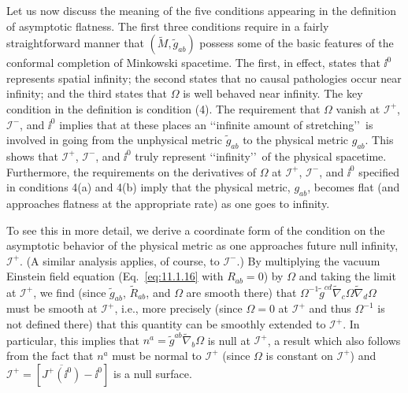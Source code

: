 Let us now discuss the meaning of the five conditions appearing in the definition of
asymptotic flatness. The first three conditions require in a fairly straightforward
manner that \((\tilde M,\tilde g_{ab})\) possess some of the basic features of the
conformal completion of Minkowski spacetime. The first, in effect, states that \(\ii^0\)
represents spatial infinity; the second states that no causal pathologies occur near
infinity; and the third states that \(\Omega\) is well behaved near infinity. The key
condition in the definition is condition (4). The requirement that \(\Omega\) vanish
at \(\mathcal I^+\), \(\mathcal I^-\), and \(\ii^0\) implies that at these places an
\lq\lq infinite amount of stretching\rq\rq\ is involved in going from the unphysical
metric \(\tilde g_{ab}\) to the physical metric \(g_{ab}\). This shows that
\(\mathcal I^+\), \(\mathcal I^-\), and \(\ii^0\) truly represent \lq\lq infinity\rq\rq\ of
the physical spacetime. Furthermore, the requirements on the derivatives of
\(\Omega\) at \(\mathcal I^+\), \(\mathcal I^-\), and \(\ii^0\) specified in conditions
4(a) and 4(b) imply that the physical metric, \(g_{ab}\), becomes flat (and
approaches flatness at the appropriate rate) as one goes to infinity.

To see this in more detail, we derive a coordinate form of the condition on the
asymptotic behavior of the physical metric as one approaches future null infinity,
\(\mathcal I^+\). (A similar analysis applies, of course, to \(\mathcal I^-\).) By
multiplying the vacuum Einstein field equation (Eq.~\eqref{eq:11.1.16} with
\(R_{ab}=0\)) by \(\Omega\) and taking the limit at \(\mathcal I^+\), we find (since
\(\tilde g_{ab}\), \(\tilde R_{ab}\), and \(\Omega\) are smooth there) that
\(\Omega^{-1}\tilde g^{cd}\tilde\nabla_c\Omega\tilde\nabla_d\Omega\) must be smooth
at \(\mathcal I^+\), i.e., more precisely (since \(\Omega=0\) at \(\mathcal I^+\) and
thus \(\Omega^{-1}\) is not defined there) that this quantity can be smoothly
extended to \(\mathcal I^+\). In particular, this implies that
\(n^a=\tilde g^{ab}\tilde\nabla_b\Omega\) is null at \(\mathcal I^+\), a result which
also follows from the fact that \(n^a\) must be normal to \(\mathcal I^+\) (since
\(\Omega\) is constant on \(\mathcal I^+\)) and
\(\mathcal I^+=[\overline{J^+(\ii^0)}-\ii^0]\) is a null surface.

